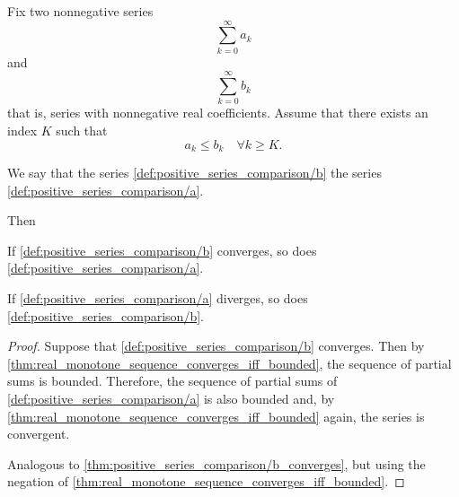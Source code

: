 \begin{proposition}\label{thm:positive_series_comparison}
  Fix two nonnegative series
  \begin{equation}\label{def:positive_series_comparison/a}
    \sum_{k=0}^\infty a_k
  \end{equation}
  and
  \begin{equation}\label{def:positive_series_comparison/b}
    \sum_{k=0}^\infty b_k
  \end{equation}
  that is, series with nonnegative real coefficients. Assume that there exists an index \( K \) such that
  \begin{equation*}
    a_k \leq b_k \quad\forall k \geq K.
  \end{equation*}

  We say that the series \cref{def:positive_series_comparison/b}  the series \cref{def:positive_series_comparison/a}.

  Then
  \begin{thmenum}
     If \cref{def:positive_series_comparison/b} converges, so does \cref{def:positive_series_comparison/a}.

     If \cref{def:positive_series_comparison/a} diverges, so does \cref{def:positive_series_comparison/b}.
  \end{thmenum}
\end{proposition}
\begin{proof}
   Suppose that \cref{def:positive_series_comparison/b} converges. Then by \cref{thm:real_monotone_sequence_converges_iff_bounded}, the sequence of partial sums is bounded. Therefore, the sequence of partial sums of \cref{def:positive_series_comparison/a} is also bounded and, by \cref{thm:real_monotone_sequence_converges_iff_bounded} again, the series is convergent.

   Analogous to \cref{thm:positive_series_comparison/b_converges}, but using the negation of \cref{thm:real_monotone_sequence_converges_iff_bounded}.
\end{proof}

